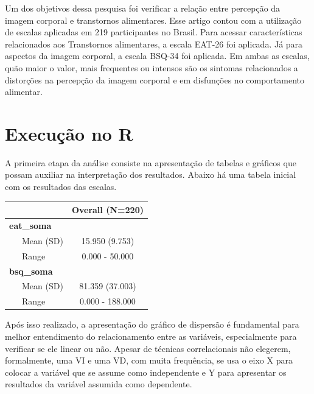 \documentclass[
]{book}
\newenvironment{Shaded}{\begin{snugshade}}{\end{snugshade}}
\newcommand{\DataTypeTok}[1]{\textcolor[rgb]{0.13,0.29,0.53}{#1}}
\newcommand{\KeywordTok}[1]{\textcolor[rgb]{0.13,0.29,0.53}{\textbf{#1}}}
\newcommand{\NormalTok}[1]{#1}
\newcommand{\OperatorTok}[1]{\textcolor[rgb]{0.81,0.36,0.00}{\textbf{#1}}}
\newcommand{\OtherTok}[1]{\textcolor[rgb]{0.56,0.35,0.01}{#1}}
\newcommand{\StringTok}[1]{\textcolor[rgb]{0.31,0.60,0.02}{#1}}
\begin{document}
Um dos objetivos dessa pesquisa foi verificar a relação entre percepção da imagem corporal e transtornos alimentares. Esse artigo contou com a utilização de escalas aplicadas em 219 participantes no Brasil. Para acessar características relacionados aos Transtornos alimentares, a escala EAT-26 foi aplicada. Já para aspectos da imagem corporal, a escala BSQ-34 foi aplicada. Em ambas as escalas, quão maior o valor, mais frequentes ou intensos são os sintomas relacionados a distorções na percepção da imagem corporal e em disfunções no comportamento alimentar.

\hypertarget{execuuxe7uxe3o-no-r-5}{%
\section{Execução no R}\label{execuuxe7uxe3o-no-r-5}}

A primeira etapa da análise consiste na apresentação de tabelas e gráficos que possam auxiliar na interpretação dos resultados. Abaixo há uma tabela inicial com os resultados das escalas.

\begin{Shaded}
\end{Shaded}

\begin{longtable}[]{@{}lc@{}}
\toprule
& Overall (N=220)\tabularnewline
\midrule
\endhead
\textbf{eat\_soma} &\tabularnewline
~~~Mean (SD) & 15.950 (9.753)\tabularnewline
~~~Range & 0.000 - 50.000\tabularnewline
\textbf{bsq\_soma} &\tabularnewline
~~~Mean (SD) & 81.359 (37.003)\tabularnewline
~~~Range & 0.000 - 188.000\tabularnewline
\bottomrule
\end{longtable}

Após isso realizado, a apresentação do gráfico de dispersão é fundamental para melhor entendimento do relacionamento entre as variáveis, especialmente para verificar se ele linear ou não. Apesar de técnicas correlacionais não elegerem, formalmente, uma VI e uma VD, com muita frequência, se usa o eixo X para colocar a variável que se assume como independente e Y para apresentar os resultados da variável assumida como dependente.
\end{document}
